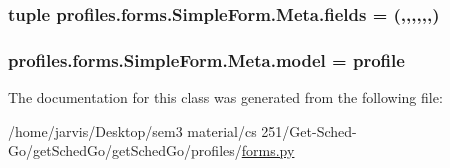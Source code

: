 \subsubsection[{\texorpdfstring{fields}{fields}}]{\setlength{\rightskip}{0pt plus 5cm}tuple profiles.\+forms.\+Simple\+Form.\+Meta.\+fields = (\textquotesingle{},\textquotesingle{},\textquotesingle{},\textquotesingle{},\textquotesingle{},\textquotesingle{},\textquotesingle{})\hspace{0.3cm}{\ttfamily [static]}}\hypertarget{classprofiles_1_1forms_1_1SimpleForm_1_1Meta_a0c22c44a508656fd360986838d98dfbe}{}\label{classprofiles_1_1forms_1_1SimpleForm_1_1Meta_a0c22c44a508656fd360986838d98dfbe}
\subsubsection[{\texorpdfstring{model}{model}}]{\setlength{\rightskip}{0pt plus 5cm}profiles.\+forms.\+Simple\+Form.\+Meta.\+model = profile\hspace{0.3cm}{\ttfamily [static]}}\hypertarget{classprofiles_1_1forms_1_1SimpleForm_1_1Meta_a9074e618eb956bf54c5a1e8b5bec702d}{}\label{classprofiles_1_1forms_1_1SimpleForm_1_1Meta_a9074e618eb956bf54c5a1e8b5bec702d}


The documentation for this class was generated from the following file\+:\begin{DoxyCompactItemize}
\item 
/home/jarvis/\+Desktop/sem3 material/cs 251/\+Get-\/\+Sched-\/\+Go/get\+Sched\+Go/get\+Sched\+Go/profiles/\hyperlink{profiles_2forms_8py}{forms.\+py}\end{DoxyCompactItemize}
